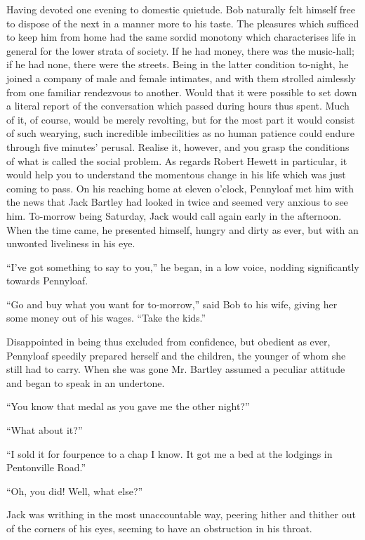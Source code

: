 Having devoted one evening to domestic quietude. Bob naturally felt
himself free to dispose of the next in a manner more to his taste. The
pleasures which sufficed to keep him from home had the same sordid
monotony which characterises life in general for the lower strata of
society. If he had money, there was the music-hall; if he had none,
there were the streets. Being in the latter condition to-night, he
joined a company of male and female intimates, and with them strolled
aimlessly from one familiar rendezvous to another. Would that it were
possible to set down a literal report of the conversation which passed
during hours thus spent. Much of it, of course, would be merely
revolting, but for the most part it would consist of such wearying, such
incredible imbecilities as no human {}patience could endure through five
minutes' perusal. Realise it, however, and you grasp the conditions of
what is called the social problem. As regards Robert Hewett in
particular, it would help you to understand the momentous change in his
life which was just coming to pass. On his reaching home at eleven
o'clock, Pennyloaf met him with the news that Jack Bartley had looked in
twice and seemed very anxious to see him. To-morrow being Saturday, Jack
would call again early in the afternoon. When the time came, he
presented himself, hungry and dirty as ever, but with an unwonted
liveliness in his eye.

``I've got something to say to you,'' he began, in a low voice, nodding
significantly towards Pennyloaf.

``Go and buy what you want for to-morrow,'' said Bob to his wife, giving
her some money out of his wages. ``Take the kids.''

Disappointed in being thus excluded from confidence, but obedient as
ever, Pennyloaf speedily prepared herself and the children, the
{}younger of whom she still had to carry. When she was gone Mr. Bartley
assumed a peculiar attitude and began to speak in an undertone.

``You know that medal as you gave me the other night?''

``What about it?''

``I sold it for fourpence to a chap I know. It got me a bed at the
lodgings in Pentonville Road.''

``Oh, you did! Well, what else?''

Jack was writhing in the most unaccountable way, peering hither and
thither out of the corners of his eyes, seeming to have an obstruction
in his throat.


